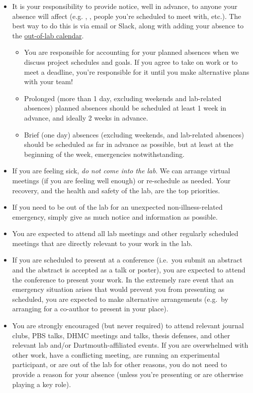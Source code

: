 \documentclass{tufte-book} %
\begin{document}
\begin{itemize}
\item It is your responsibility to provide notice, well in advance, to anyone your absence will
  affect (e.g. \director, \coordinator, people you're scheduled to
  meet with, etc.).  The best way to do this is via email or Slack, along with adding your
  absence to the
  \hyperref[sec: scheduling]{out-of-lab
    calendar}.
\begin{itemize}
\item You are responsible for accounting for your planned absences
  when we discuss project schedules and goals.  If you agree to take on work
  or to meet a deadline, you're responsible for it until you make
  alternative plans with your team!
\item Prolonged (more than 1 day, excluding weekends and
  lab-related absences) planned
  absences should be scheduled at least 1 week in advance, and ideally
  2 weeks in advance.
\item Brief (one day) absences (excluding weekends, and lab-related
  absences) should be scheduled as far in advance as possible, but at
  least at the beginning of the week, emergencies notwithstanding.
\end{itemize}

\item If you are feeling sick, \textit{do not come into the lab}.  We can
  arrange virtual meetings (if you are feeling well enough) or
  re-schedule as needed.  Your recovery, and the health and safety of the lab, are the top
  priorities.

\item If you need to be out of the lab for an unexpected non-illness-related
  emergency, simply give as much notice and information as possible.

\item You are expected to attend all lab meetings and other regularly
  scheduled meetings that are directly relevant to your work in the
  lab.

\item If you are scheduled to present at a conference (i.e.\ you
  submit an abstract and the abstract is accepted as a talk or
  poster), you are expected to attend the conference to present your
  work.  In the extremely rare event that an emergency situation
  arises that would prevent you from presenting as scheduled, you are
  expected to make alternative arrangements (e.g.\ by arranging for a
  co-author to present in your place).

\item You are strongly encouraged (but never required) to attend
  relevant journal clubs, PBS talks, DHMC
  meetings and talks, thesis defenses, and other relevant lab and/or
  Dartmouth-affiliated events.  If you are overwhelmed with other
  work, have a conflicting meeting, are running an experimental
  participant, or are out of the lab for other reasons, you do not
  need to provide a reason for your absence (unless you're presenting
  or are otherwise playing a key role).
\end{itemize}
\end{document}
